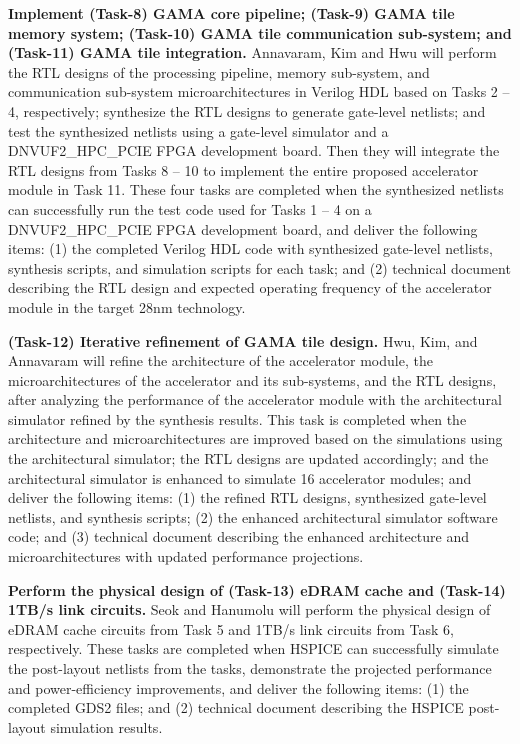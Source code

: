 \vspace{3pt}
\noindent
\textbf{Implement (Task-8) GAMA core pipeline; (Task-9) GAMA tile memory system; (Task-10) GAMA tile communication sub-system; and (Task-11) GAMA tile integration.}
 Annavaram, Kim and Hwu will perform the RTL designs of the processing pipeline, memory sub-system, and communication sub-system microarchitectures in Verilog HDL based on Tasks 2 -- 4, respectively; synthesize the RTL designs to generate gate-level netlists; and test the synthesized netlists using a gate-level simulator and a DNVUF2\_HPC\_PCIE FPGA development board.  
Then they will integrate the RTL designs from Tasks 8 -- 10 to implement the entire proposed accelerator module in Task 11. 
These four tasks are completed when the synthesized netlists can successfully run the test code used for Tasks 1 -- 4 on a DNVUF2\_HPC\_PCIE FPGA development board, and deliver the following items:
(1) the completed Verilog HDL code with synthesized gate-level netlists, synthesis scripts, and simulation scripts for each task; and 
(2) technical document describing the RTL design and expected operating frequency of the accelerator module in the target 28nm technology.


\vspace{3pt}
\noindent
\textbf{(Task-12) Iterative refinement of GAMA tile design.} 
Hwu, Kim, and Annavaram will refine the architecture of the accelerator module, the microarchitectures of the accelerator and its sub-systems, and the RTL designs, after analyzing the performance of the accelerator module with the architectural simulator refined by the synthesis results.
This task is completed when 
the architecture and microarchitectures are improved based on the simulations using the architectural simulator; 
the RTL designs are updated accordingly; and
the architectural simulator is enhanced to simulate 16 accelerator modules; and 
deliver the following items:
(1) the refined RTL designs, synthesized gate-level netlists, and synthesis scripts; 
(2) the enhanced architectural simulator software code; and
(3) technical document describing the enhanced architecture and microarchitectures with updated performance projections.


\vspace{3pt}
\noindent
\textbf{Perform the physical design of (Task-13) eDRAM cache and (Task-14)  1TB/s link circuits.} 
Seok and Hanumolu will perform the physical design of eDRAM cache circuits from Task 5 and 1TB/s link circuits from Task 6, respectively.
These tasks are completed when HSPICE can successfully simulate the post-layout netlists from the tasks, demonstrate the projected performance and power-efficiency improvements, and deliver the following items:
(1) the completed GDS2 files; and (2) technical document describing the HSPICE post-layout simulation results.


